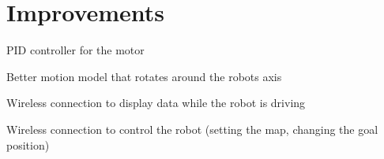 \documentclass[Main]{subfiles}
\begin{document}
\section{Improvements} %
	\label{sec:improvements}

	PID controller for the motor
	
	Better motion model that rotates around the robots axis
	
	Wireless connection to display data while the robot is driving
	
	Wireless connection to control the robot (setting the map, changing the goal position)
	
\end{document}

